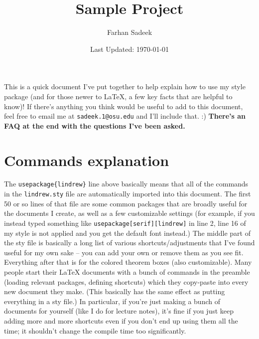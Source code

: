 \documentclass[11pt]{article}
\title{Sample Project}
\author{Farhan Sadeek}
\date{Last Updated: \today}
\begin{document}
\maketitle
This is a quick document I've put together to help explain how to use my style
package (and for those newer to \LaTeX, a few key facts that are helpful to
know)! If there's anything you think would be useful to add to this document,
feel free to email me at \texttt{sadeek.1@osu.edu} and I'll include that. :)
\textbf{There's an FAQ at the end with the questions I've been asked.}
\section{Commands explanation}
The \texttt{usepackage\{lindrew\}} line above basically means that all of the
commands in the \texttt{lindrew.sty} file are automatically imported into this
document. The first 50 or so lines of that file are some common packages that
are broadly useful for the documents I create, as well as a few customizable
settings (for example, if you instead typed something like
\texttt{usepackage[serif][lindrew]} in line 2, line 16 of my style is not
applied and you get the default font instead.) The middle part of the sty file
is basically a long list of various shortcuts/adjustments that I've found
useful for my own sake -- you can add your own or remove them as you see fit.
Everything after that is for the colored theorem boxes (also customizable).
\newline Many people start their LaTeX documents with a bunch of commands in
the preamble (loading relevant packages, defining shortcuts) which they
copy-paste into every new document they make. (This basically has the same
effect as putting everything in a sty file.) In particular, if you're just
making a bunch of documents for yourself (like I do for lecture notes), it's
fine if you just keep adding more and more shortcuts even if you don't end up
using them all the time; it shouldn't change the compile time too
significantly.
\end{document}
